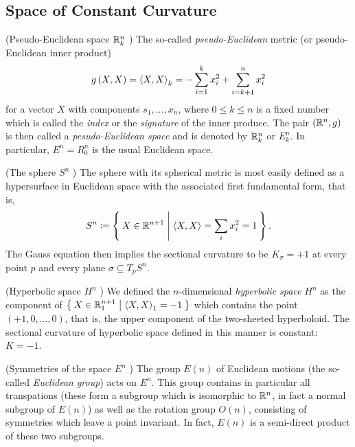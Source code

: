 \documentclass[../main.tex]{subfiles}
\begin{document}
\subsection{Space of Constant Curvature}
\begin{definition}(Pseudo-Euclidean space \(\mathbb{R}^n_k\) {\autocite[][Chapter~7A]{kuhnelwolfgang_2006}})
The so-called \textit{pseudo-Euclidean} metric (or pseudo-Euclidean inner product)
\[
g\left(X,X\right)
=\left\langle{X},{X}\right\rangle_k
=-\sum_{i=1}^{k}x_i^2+\sum_{i=k+1}^{n}x_i^2
\]
for a vector \(X\) with components \(s_1,\dots,x_n\),
where \(0\le k\le n\) is a fixed number which is called the \textit{index} or the \textit{signature} of the inner produce.
The pair \(\left(\mathbb{R}^n,g\right)\) is then called a \textit{pesudo-Euclidean space}
and is denoted by \(\mathbb{R}^n_k\) or \(E^n_k\).
In particular, \(E^n=R^n_0\) is the usual Euclidean space.
\end{definition}
\begin{definition}(The sphere \(S^n\) {\autocite[][Chapter~7A]{kuhnelwolfgang_2006}})
The sphere with its spherical metric is most easily defined as a hypersurface in Euclidean space with the associated first fundamental form, that is,
\[
S^n\coloneqq\Set{X\in\mathbb{R}^{n+1}|\left\langle{X},{X}\right\rangle=\sum_ix_i^2=1}\text{.}
\]
The Gauss equation then implies the sectional curvature to be \(K_\sigma=+1\) at every point \(p\) and every plane \(\sigma\subseteq T_pS^n\).
\end{definition}
\begin{definition}(Hyperbolic space \(H^n\) {\autocite[][Chapter~7A]{kuhnelwolfgang_2006}})
We defined the \(n\)-dimensional \textit{hyperbolic space} \(H^n\)
as the component of \(\Set{X\in\mathbb{R}^{n+1}_1|\left\langle{X},{X}\right\rangle_1=-1}\)
which contains the point \(\left(+1,0,\dots,0\right)\),
that is, the upper component of the two-sheeted hyperboloid.
The sectional curvature of hyperbolic space defined in this manner is constant: \(K=-1\).
\end{definition}
\begin{definition}(Symmetries of the space \(E^n\) {\autocite[][Chapter~7A]{kuhnelwolfgang_2006}})\label{Group:Euclidean}
The group \(E\left(n\right)\) of Euclidean motions
(the so-called \textit{Euclidean group})
acts on \(E^n\).
This group contains in particular all transpations
(these form a subgroup which is isomorphic to \(\mathbb{R}^n\), in fact a normal subgroup of \(E\left(n\right)\))
as well as the rotation group \(O\left(n\right)\),
consisting of symmetries which leave a point invariant.
In fact, \(E\left(n\right)\) is a semi-direct product of these two subgroups.
\end{definition}
\end{document}
